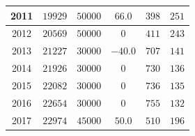 \documentclass[10pt,a4paper]{report}
\begin{document}
\begin{doublespacing}
\begin{table}[H]
{\begin{tabular}{|c|c|c|c|c|c|}
			2011           & \( 19929 \)                                                                               & \( 50000 \)                                                              & \( 66.0 \)             & \( 398 \)                                                                          & \( 251 \)                                                                          \\ \hline
			2012           & \( 20569 \)                                                                               & \( 50000 \)                                                              & \( 0 \)                & \( 411 \)                                                                          & \( 243 \)                                                                          \\ \hline
			2013           & \( 21227 \)                                                                               & \( 30000 \)                                                              & \( -40.0 \)            & \( 707 \)                                                                          & \( 141 \)                                                                          \\ \hline
			2014           & \( 21926 \)                                                                               & \( 30000 \)                                                              & \( 0 \)                & \( 730 \)                                                                          & \( 136 \)                                                                          \\ \hline
			2015           & \( 22082 \)                                                                               & \( 30000 \)                                                              & \( 0 \)                & \( 736 \)                                                                          & \( 135 \)                                                                          \\ \hline
			2016           & \( 22654 \)                                                                               & \( 30000 \)                                                              & \( 0 \)                & \( 755 \)                                                                          & \( 132 \)                                                                          \\ \hline
			2017           & \( 22974 \)                                                                               & \( 45000 \)                                                              & \( 50.0 \)             & \( 510 \)                                                                          & \( 196 \)                                                                          \\ \hline

\end{tabular}}
\end{table}
\end{doublespacing}
\end{document}
